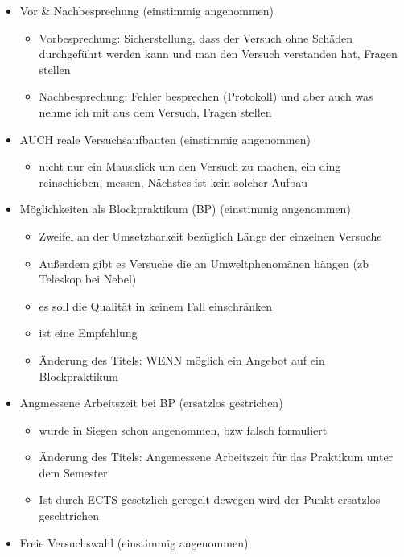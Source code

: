 \begin{itemize}
    \begin{itemize}
      \item Vor & Nachbesprechung (einstimmig angenommen)
        \begin{itemize}
          \item Vorbesprechung: Sicherstellung, dass der Versuch ohne Schäden durchgeführt werden kann und man den Versuch verstanden hat, Fragen stellen
          \item Nachbesprechung: Fehler besprechen (Protokoll) und aber auch was nehme ich mit aus dem Versuch, Fragen stellen
        \end{itemize}
      \item AUCH reale Versuchsaufbauten (einstimmig angenommen)
        \begin{itemize}
          \item nicht nur ein Mausklick um den Versuch zu machen, ein ding reinschieben, messen, Nächstes ist kein solcher Aufbau
        \end{itemize}
      \item Möglichkeiten als Blockpraktikum (BP) (einstimmig angenommen)
        \begin{itemize}
          \item Zweifel an der Umsetzbarkeit bezüglich Länge der einzelnen Versuche
          \item Außerdem gibt es Versuche die an Umweltphenomänen hängen (zb Teleskop bei Nebel)
          \item es soll die Qualität in keinem Fall einschränken
          \item ist eine Empfehlung
          \item Änderung des Titels: WENN möglich ein Angebot auf ein Blockpraktikum
        \end{itemize}
      \item Angmessene Arbeitszeit bei BP (ersatzlos gestrichen)
        \begin{itemize}
          \item wurde in Siegen schon angenommen, bzw falsch formuliert
          \item Änderung des Titels: Angemessene Arbeitszeit für das Praktikum unter dem Semester
          \item Ist durch ECTS gesetzlich geregelt dewegen wird der Punkt ersatzlos geschtrichen
        \end{itemize}
      \item Freie Versuchswahl (einstimmig angenommen)
        \begin{itemize}

\end{itemize}
\end{itemize}
\end{itemize}
